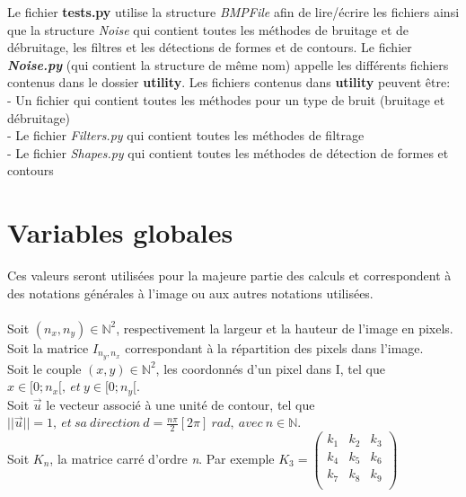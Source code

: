 \documentclass{article}
\newcommand{\N}{\mathbb{N}} %
\begin{document}
			Le fichier \textbf{tests.py} utilise la structure \emph{BMPFile} afin de lire/écrire les fichiers ainsi que la structure \emph{Noise} qui contient toutes les méthodes de bruitage et de débruitage, les filtres et les détections de formes et de contours. Le fichier \emph{\textbf{Noise.py}} (qui contient la structure de même nom) appelle les différents fichiers contenus dans le dossier \textbf{utility}. Les fichiers contenus dans \textbf{utility} peuvent être:\\
			- Un fichier qui contient toutes les méthodes pour un type de bruit (bruitage et débruitage)\\
			- Le fichier \emph{Filters.py} qui contient toutes les méthodes de filtrage\\
			- Le fichier \emph{Shapes.py} qui contient toutes les méthodes de détection de formes et contours

	\section{Variables globales}
		Ces valeurs seront utilisées pour la majeure partie des calculs et correspondent à des notations générales à l'image ou aux autres notations utilisées.\\\\
		\noindent
		Soit \begin{math}(n_x, n_y)\in\N^2\end{math}, respectivement la largeur et la hauteur de l'image en pixels.\\
		Soit la matrice \begin{math}I_{n_y, n_x}\end{math} correspondant à la répartition des pixels dans l'image.\\
		Soit le couple \begin{math}(x,y)\in\N^2\end{math}, les coordonnés d'un pixel dans I, tel que \begin{math}x\in[0;n_x[,\ et\ y\in[0;n_y[\end{math}.\\
		Soit \begin{math}\vec{u}\end{math} le vecteur associé à une unité de contour, tel que \begin{math}||\vec{u}|| = 1,\ et\ sa\ direction\ d =\frac{n\pi}{2}[2\pi]\ rad,\ avec\ n\in\N\end{math}.\\
		Soit \begin{math}K_n\end{math}, la matrice carré d'ordre \emph{n}. Par exemple \begin{math}K_3 = \begin{pmatrix}k_1&k_2&k_3\\k_4&k_5&k_6\\k_7&k_8&k_9\\\end{pmatrix}\end{math}\\\\
\end{document}
